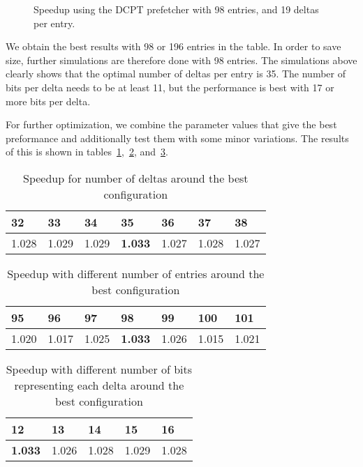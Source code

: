 \begin{figure}[h!]
	\begin{centering}
		
		\caption{Speedup using the DCPT prefetcher with 98 entries, and 19 deltas per entry.}
		\label{figure:dcpt-delta-bits}
	\end{centering}
\end{figure}

We obtain the best results with 98 or 196 entries in the table. In order to save
size, further simulations are therefore done with 98 entries. The simulations
above clearly shows that the optimal number of deltas per entry is 35. The
number of bits per delta needs to be at least 11, but the performance is best
with 17 or more bits per delta.

For further optimization, we combine the parameter values that give the best
preformance and additionally test them with some minor variations. The results
of this is shown in tables~\ref{tab:numdelta},~\ref{tab:tablesize},
and~\ref{tab:deltabits}.

\begin{table}[h!]
	\centering
	\begin{tabular}{|l|l|l|l|l|l|l|}
		\hline
		32	& 33	& 34	& \textbf{35}	& 36	& 37	& 38	\\
		\hline
		1.028 & 1.029 & 1.029 & \textbf{1.033} & 1.027 & 1.028 & 1.027 \\
		\hline
	\end{tabular}
	\smallskip
	\caption{Speedup for number of deltas around the best configuration}
	\label{tab:numdelta}
\end{table}

\begin{table}[h!]
	\centering
	\begin{tabular}{|l|l|l|l|l|l|l|}
		\hline
		95	& 96	& 97	& \textbf{98}	& 99	& 100	& 101	\\
		\hline
		1.020 & 1.017 & 1.025 & \textbf{1.033} & 1.026 & 1.015 & 1.021 \\
		\hline
	\end{tabular}
	\smallskip
	\caption{Speedup with different number of entries around the best configuration}
	\label{tab:tablesize}
\end{table}

\begin{table}[h!]
	\centering
	\begin{tabular}{|l|l|l|l|l|}
		\hline
		\textbf{12}	& 13	& 14	& 15	& 16	\\
		\hline
		\textbf{1.033} & 1.026 & 1.028 & 1.029 & 1.028 \\
		\hline
	\end{tabular}
	\smallskip
	\caption{Speedup with different number of bits representing each delta around the best configuration}
	\label{tab:deltabits}
\end{table}

